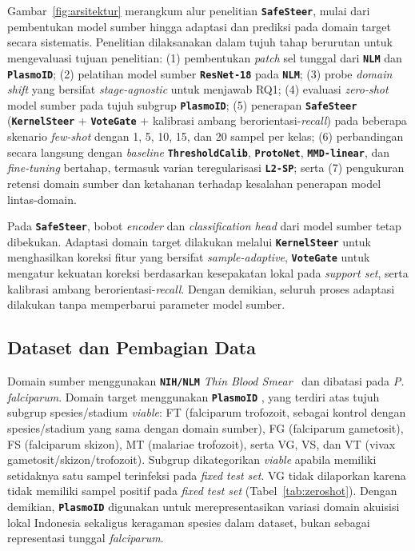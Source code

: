 \documentclass[conference]{IEEEtran}
\newcommand{\nama}[1]{\textbf{\texttt{#1}}}
\begin{document}
Gambar~\ref{fig:arsitektur} merangkum alur penelitian \nama{SafeSteer},
mulai dari pembentukan model sumber hingga adaptasi dan prediksi
pada domain target secara sistematis.
Penelitian dilaksanakan dalam tujuh tahap berurutan untuk mengevaluasi tujuan penelitian:
(1) pembentukan \textit{patch} sel tunggal dari \nama{NLM} dan \nama{PlasmoID};
(2) pelatihan model sumber \nama{ResNet-18} pada \nama{NLM};
(3) probe \textit{domain shift} yang bersifat
\textit{stage-agnostic} untuk menjawab RQ1;
(4) evaluasi \textit{zero-shot} model sumber pada tujuh subgrup
\nama{PlasmoID};
(5) penerapan \nama{SafeSteer} (\nama{KernelSteer} + \nama{VoteGate} + kalibrasi
ambang berorientasi-\textit{recall}) pada beberapa skenario
\textit{few-shot} dengan 1, 5, 10, 15, dan 20 sampel per kelas;
(6) perbandingan secara langsung dengan \textit{baseline} \nama{ThresholdCalib},
\nama{ProtoNet}, \nama{MMD-linear}, dan \textit{fine-tuning} bertahap,
termasuk varian teregularisasi \nama{L2-SP}; serta
(7) pengukuran retensi domain sumber dan ketahanan terhadap
kesalahan penerapan model lintas-domain.

Pada \nama{SafeSteer}, bobot \textit{encoder} dan
\textit{classification head} dari model sumber tetap dibekukan.
Adaptasi domain target dilakukan melalui \nama{KernelSteer} untuk
menghasilkan koreksi fitur yang bersifat
\textit{sample-adaptive}, \nama{VoteGate} untuk mengatur kekuatan
koreksi berdasarkan kesepakatan lokal pada \textit{support set},
serta kalibrasi ambang berorientasi-\textit{recall}. Dengan
demikian, seluruh proses adaptasi dilakukan tanpa memperbarui
parameter model sumber.

\subsection{Dataset dan Pembagian Data}
Domain sumber menggunakan \nama{NIH/NLM} \textit{Thin Blood Smear}~\cite{b15} dan dibatasi pada \textit{P. falciparum}. Domain target menggunakan \nama{PlasmoID} \cite{b22}, yang terdiri atas tujuh subgrup spesies/stadium \textit{viable}: FT (falciparum trofozoit, sebagai kontrol dengan spesies/stadium yang sama dengan domain sumber), FG (falciparum gametosit), FS (falciparum skizon), MT (malariae trofozoit), serta VG, VS, dan VT (vivax gametosit/skizon/trofozoit). Subgrup dikategorikan \textit{viable} apabila memiliki setidaknya satu sampel terinfeksi pada \textit{fixed test set}. VG tidak dilaporkan karena tidak memiliki sampel positif pada \textit{fixed test set} (Tabel~\ref{tab:zeroshot}). Dengan demikian, \nama{PlasmoID} digunakan untuk merepresentasikan variasi domain akuisisi lokal Indonesia sekaligus keragaman spesies dalam dataset, bukan sebagai representasi tunggal \textit{falciparum}.
\end{document}
